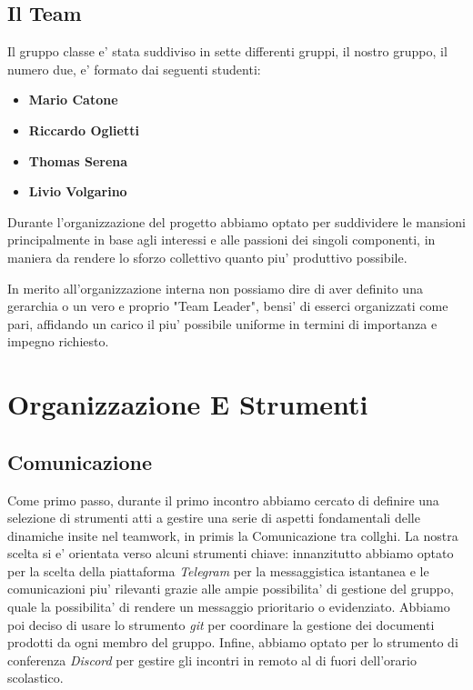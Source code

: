 \documentclass{report}
\begin{document}
		\section{Il Team}
			Il gruppo classe e' stata suddiviso in sette differenti gruppi, il nostro gruppo, il numero due, e' formato dai 
			seguenti studenti:
			\begin{itemize}
				\item \textbf{Mario Catone}
				\item \textbf{Riccardo Oglietti}
				\item \textbf{Thomas Serena}
				\item \textbf{Livio Volgarino}
			\end{itemize}
			Durante l'organizzazione del progetto abbiamo optato per suddividere le mansioni principalmente in base agli
			interessi e alle passioni dei singoli componenti, in maniera da rendere lo sforzo collettivo quanto piu'
			produttivo possibile. 

			In merito all'organizzazione interna non possiamo dire di aver definito una gerarchia o un vero e proprio 
			"Team Leader", bensi' di esserci organizzati come pari, affidando un carico il piu' possibile uniforme in 
			termini di importanza e impegno richiesto.

	\chapter{Organizzazione E Strumenti}        
		\section{Comunicazione}
			Come primo passo, durante il primo incontro abbiamo cercato di definire una selezione di strumenti atti a 
			gestire una serie di aspetti fondamentali delle dinamiche insite nel teamwork, in primis la Comunicazione
			tra collghi.
			La nostra scelta si e' orientata verso alcuni strumenti chiave: innanzitutto abbiamo optato per la scelta
			della piattaforma \emph{Telegram} per la messaggistica istantanea e le comunicazioni piu' rilevanti grazie
			alle ampie possibilita' di gestione del gruppo, quale la possibilita' di rendere un messaggio prioritario o
			evidenziato. Abbiamo poi deciso di usare lo strumento \emph{git} per coordinare la gestione dei documenti
			prodotti da ogni membro del gruppo. Infine, abbiamo optato per lo strumento di conferenza \emph{Discord} per
			gestire gli incontri in remoto al di fuori dell'orario scolastico.
\end{document}
